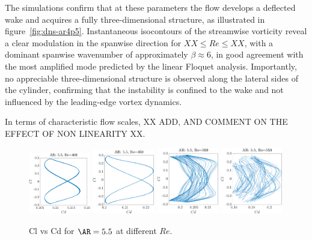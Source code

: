 The simulations confirm that at these parameters the flow develops a deflected wake and acquires a fully three-dimensional structure, as illustrated in figure~\ref{fig:dns-ar4p5}. Instantaneous isocontours of the streamwise vorticity reveal a clear modulation in the spanwise direction for $ XX \le Re \le XX $, with a dominant spanwise wavenumber of approximately $\beta \approx 6$, in good agreement with the most amplified mode predicted by the linear Floquet analysis. Importantly, no appreciable three-dimensional structure is observed along the lateral sides of the cylinder, confirming that the instability is confined to the wake and not influenced by the leading-edge vortex dynamics.

In terms of characteristic flow scales, XX ADD, AND COMMENT ON THE EFFECT OF NON LINEARITY XX.

\begin{figure}
  \centering
  \includegraphics[width=0.24\textwidth]{./fig/nnl/ClCdAR5.5RE400.png}
  \includegraphics[width=0.24\textwidth]{./fig/nnl/ClCdAR5.5RE450.png}
  \includegraphics[width=0.24\textwidth]{./fig/nnl/ClCdAR5.5RE500.png}
  \includegraphics[width=0.24\textwidth]{./fig/nnl/ClCdAR5.5RE550.png}
  \caption{Cl vs Cd for $\AR=5.5$ at different $Re$.}
  \label{fig:ClCd}
\end{figure}

